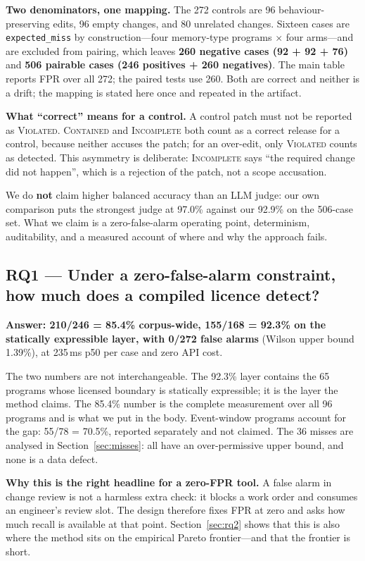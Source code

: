 \documentclass[acmsmall,screen,review,anonymous]{acmart}
\begin{document}
\textbf{Two denominators, one mapping.} The 272 controls are 96 behaviour-preserving edits, 96 empty changes, and 80 unrelated changes. Sixteen cases are \texttt{expected\_miss} by construction---four memory-type programs $\times$ four arms---and are excluded from pairing, which leaves \textbf{260 negative cases (92 + 92 + 76)} and \textbf{506 pairable cases (246 positives + 260 negatives)}. The main table reports FPR over all 272; the paired tests use 260. Both are correct and neither is a drift; the mapping is stated here once and repeated in the artifact.

\textbf{What ``correct'' means for a control.} A control patch must not be reported as \textsc{Violated}. \textsc{Contained} and \textsc{Incomplete} both count as a correct release for a control, because neither accuses the patch; for an over-edit, only \textsc{Violated} counts as detected. This asymmetry is deliberate: \textsc{Incomplete} says ``the required change did not happen'', which is a rejection of the patch, not a scope accusation.

We do \textbf{not} claim higher balanced accuracy than an LLM judge: our own comparison puts the strongest judge at 97.0\% against our 92.9\% on the 506-case set. What we claim is a zero-false-alarm operating point, determinism, auditability, and a measured account of where and why the approach fails.

\subsection{RQ1 --- Under a zero-false-alarm constraint, how much does a compiled licence detect?}

\textbf{Answer: 210/246 = 85.4\% corpus-wide, 155/168 = 92.3\% on the statically expressible layer, with 0/272 false alarms} (Wilson upper bound 1.39\%), at 235\,ms p50 per case and zero API cost.

The two numbers are not interchangeable. The 92.3\% layer contains the 65 programs whose licensed boundary is statically expressible; it is the layer the method claims. The 85.4\% number is the complete measurement over all 96 programs and is what we put in the body. Event-window programs account for the gap: 55/78 = 70.5\%, reported separately and not claimed. The 36 misses are analysed in Section~\ref{sec:misses}: all have an over-permissive upper bound, and none is a data defect.

\textbf{Why this is the right headline for a zero-FPR tool.} A false alarm in change review is not a harmless extra check: it blocks a work order and consumes an engineer's review slot. The design therefore fixes FPR at zero and asks how much recall is available at that point. Section~\ref{sec:rq2} shows that this is also where the method sits on the empirical Pareto frontier---and that the frontier is short.
\end{document}
